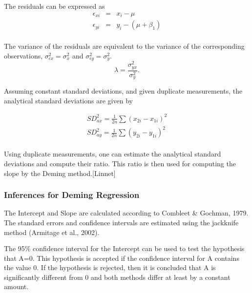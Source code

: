 \documentclass[12pt, a4paper]{report}
\theoremstyle{plain}
\theoremstyle{definition}
\theoremstyle{remark}
\begin{document}
	The residuals can be expressed as
	\begin{eqnarray*}
		\epsilon_{xi} &=& x_{i} - \mu  \\
		\epsilon_{yi} &=& y_{i} - (\mu + \beta_{1}) \\
	\end{eqnarray*}
	
	The variance of the residuals are equivalent to the variance of the corresponding observations, $\sigma^{2}_{\epsilon x} =
	\sigma^{2}_{x}$ and $\sigma^{2}_{\epsilon y} = \sigma^{2}_{y}$.
	\begin{equation}
	\lambda = \frac{\sigma^{2}_{yx}}{\sigma^{2}_{y}}.
	\end{equation}
	
	Assuming constant standard deviations, and given duplicate measurements, the analytical standard deviations are given by
	
	\begin{eqnarray*}
		SD^{2}_{ax} = \frac{1}{2n} \sum (x_{2i} - x_{1i})^{2}\\
		SD^{2}_{ay} = \frac{1}{2n} \sum (y_{2i} - y_{1i})^{2}\\
	\end{eqnarray*}
	
	Using duplicate measurements, one can estimate the analytical
	standard deviations and compute their ratio. This ratio is then
	used for computing the slope by the Deming method.[Linnet]
	
	
	
	\subsubsection{Inferences for Deming Regression}
	The Intercept and Slope are calculated according to Combleet \& Gochman, 1979. The standard errors and confidence intervals are estimated using the jackknife method (Armitage et al., 2002).
	
	The 95\% confidence interval for the Intercept can be used to test the hypothesis that A=0. This hypothesis is accepted if the confidence interval for A contains the value 0. If the hypothesis is rejected, then it is concluded that A is significantly different from 0 and both methods differ at least by a constant amount.
	
\end{document}
